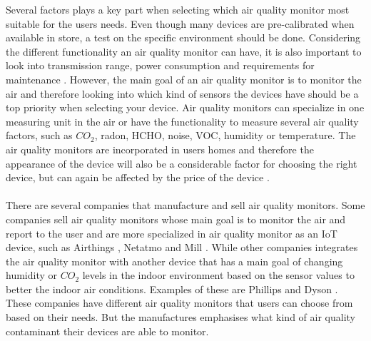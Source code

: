 Several factors plays a key part when selecting which air quality monitor most suitable for the users needs. Even though many devices are pre-calibrated when available in store, a test on the specific environment should be done. Considering the different functionality an air quality monitor can have, it is also important to look into transmission range, power consumption and requirements for maintenance \cite{AQMBigSource}. However, the main goal of an air quality monitor is to monitor the air and therefore looking into which kind of sensors the devices have should be a top priority when selecting your device. Air quality monitors can specialize in one measuring unit in the air or have the functionality to measure several air quality factors, such as \(CO_2\), radon, HCHO, noise, VOC, humidity or temperature. The air quality monitors are incorporated in users homes and therefore the appearance of the device will also be a considerable factor for choosing the right device, but can again be affected by the price of the device \cite{IAQMonitorCommunicationReview}. 
\\\\
There are several companies that manufacture and sell air quality monitors. Some companies sell air quality monitors whose main goal is to monitor the air and report to the user and are more specialized in air quality monitor as an IoT device, such as Airthings \cite{Airthings}, Netatmo \cite{Netatmo} and Mill \cite{Mill}. While other companies integrates the air quality monitor with another device that has a main goal of changing humidity or \(CO_2\) levels in the indoor environment based on the sensor values to better the indoor air conditions. Examples of these are Phillips \cite{Philips} and Dyson \cite{Dyson}. These companies have different air quality monitors that users can choose from based on their needs. But the manufactures emphasises what kind of air quality contaminant their devices are able to monitor. 
\\\\

